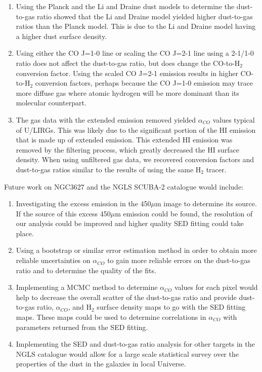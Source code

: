 \begin{enumerate}
\item{Using the Planck and the Li and Draine dust models to determine the dust-to-gas ratio showed that the Li and Draine model yielded higher dust-to-gas ratios than the Planck model.  This is due to the Li and Draine model having a higher dust surface density.}

\item{Using either the CO J=1-0 line or scaling the CO J=2-1 line using a 2-1/1-0 ratio does not affect the dust-to-gas ratio, but does change the CO-to-H$_2$ conversion factor.  Using the scaled CO J=2-1 emission results in higher CO-to-H$_2$ conversion factors, perhaps because the CO J=1-0 emission may trace more diffuse gas \citep{wilson1990} where atomic hydrogen will be more dominant than its molecular counterpart.}

\item{The gas data with the extended emission removed yielded $\alpha_{CO}$ values typical of U/LIRGs.  This was likely due to the significant portion of the HI emission that is made up of extended emission.  This extended HI emission was removed by the filtering process, which greatly decreased the HI surface density.  When using unfiltered gas data, we recovered conversion factors and dust-to-gas ratios similar to the results of \cite{sandstrom2013} using the same H$_2$ tracer.}

\end{enumerate}

Future work on NGC3627 and the NGLS SCUBA-2 catalogue would include:

\begin{enumerate}

\item{Investigating the excess emission in the 450$\mu$m image to determine its source.  If the source of this excess 450$\mu$m emission could be found, the resolution of our analysis could be improved and higher quality SED fitting could take place.}

\item{Using a bootstrap or similar error estimation method in order to obtain more reliable uncertainties on $\alpha_{CO}$ to gain more reliable errors on the dust-to-gas ratio and to determine the quality of the fits.}

\item{Implementing a MCMC method to determine $\alpha_{CO}$ values for each pixel would help to decrease the overall scatter of the dust-to-gas ratio and provide dust-to-gas ratio, $\alpha_{CO}$, and H$_2$ surface density maps to go with the SED fitting maps.  These maps could be used to determine correlations in $\alpha_{CO}$ with parameters returned from the SED fitting.}

\item{Implementing the SED and dust-to-gas ratio analysis for other targets in the NGLS catalogue would allow for a large scale statistical survey over the properties of the dust in the galaxies in local Universe.}

\end{enumerate}